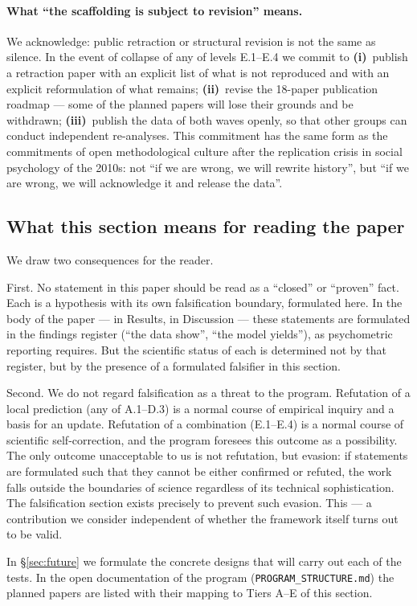 \paragraph{What ``the scaffolding is subject to revision'' means.}
We acknowledge: public retraction or structural revision is not the same as silence. In the event of collapse of any of levels E.1--E.4 we commit to \textbf{(i)}~publish a retraction paper with an explicit list of what is not reproduced and with an explicit reformulation of what remains; \textbf{(ii)}~revise the 18-paper publication roadmap --- some of the planned papers will lose their grounds and be withdrawn; \textbf{(iii)}~publish the data of both waves openly, so that other groups can conduct independent re-analyses. This commitment has the same form as the commitments of open methodological culture after the replication crisis in social psychology of the 2010s: not ``if we are wrong, we will rewrite history'', but ``if we are wrong, we will acknowledge it and release the data''.

\subsection{What this section means for reading the paper}
\label{subsec:falsification_closing}

We draw two consequences for the reader.

First. No statement in this paper should be read as a ``closed'' or ``proven'' fact. Each is a hypothesis with its own falsification boundary, formulated here. In the body of the paper --- in Results, in Discussion --- these statements are formulated in the findings register (``the data show'', ``the model yields''), as psychometric reporting requires. But the scientific status of each is determined not by that register, but by the presence of a formulated falsifier in this section.

Second. We do not regard falsification as a threat to the program. Refutation of a local prediction (any of A.1--D.3) is a normal course of empirical inquiry and a basis for an update. Refutation of a combination (E.1--E.4) is a normal course of scientific self-correction, and the program foresees this outcome as a possibility. The only outcome unacceptable to us is not refutation, but evasion: if statements are formulated such that they cannot be either confirmed or refuted, the work falls outside the boundaries of science regardless of its technical sophistication. The falsification section exists precisely to prevent such evasion. This --- a contribution we consider independent of whether the framework itself turns out to be valid.

In §\ref{sec:future} we formulate the concrete designs that will carry out each of the tests. In the open documentation of the program (\texttt{PROGRAM\_STRUCTURE.md}) the planned papers are listed with their mapping to Tiers A--E of this section.
